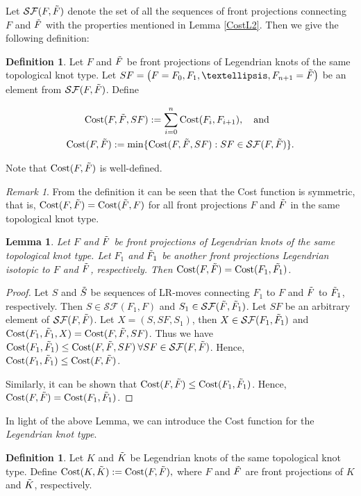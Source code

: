 \documentclass[11pt]{amsart}
\numberwithin{equation}{section}
\theoremstyle{plain}
\newtheorem{Lemma}[equation]{Lemma}
\theoremstyle{definition}
\newtheorem{definition}[equation]{Definition}
\theoremstyle{remark} \newtheorem{remark}[equation]{Remark}
\theoremstyle{remark} \newtheorem{observation}[equation]{Observation}
\newcommand{\Cost}{\text{Cost}}
\begin{document}
Let $\mathcal{SF}(F,\Tilde{F})$ denote the set of all the sequences of front projections connecting $F$ and $\Tilde{F}$ with the properties mentioned in Lemma \ref{CostL2}. Then we give the following definition: 
\begin{definition}
 Let $F$ and $\Tilde{F}$ be front projections of Legendrian knots of the same topological knot type. Let $SF=\left(F=F_0,F_1,\ldots,F_{n+1}=\Tilde{F}\right)$ be an element from $ \mathcal{SF}(F,\Tilde{F})$. Define

 \begin{align*}
     \Cost(F,\Tilde{F},SF)&:=\sum_{i=0}^{n}\Cost(F_{i},F_{i+1}), \quad \text{and}\\
     \Cost(F,\Tilde{F}):=\min\{&\Cost(F,\Tilde{F},SF):SF\in \mathcal{SF}(F,\Tilde{F})\}.
 \end{align*}
\end{definition}
Note that $\Cost(F,\Tilde{F})$ is well-defined.
\begin{remark}\label{re:Cost1}
    From the definition it can be seen that the Cost function is symmetric, that is, $\Cost(F,\Tilde{F})=\Cost(\Tilde{F},F)$ for all front projections $F$ and $\Tilde{F}$ in the same topological knot type.
\end{remark}

\begin{Lemma}\label{CostL3}
   Let $F$ and $\Tilde{F}$ be front projections of Legendrian knots of the same topological knot type. Let $F_1$ and $\Tilde{F}_1$ be another front projections Legendrian isotopic to $F$ and $\Tilde{F}$, respectively. Then $\Cost(F,\Tilde{F})=\Cost(F_1,\Tilde{F_1})$.
\end{Lemma}
\begin{proof}
    Let $S$ and $\Tilde{S}$ be sequences of LR-moves connecting $F_1$ to $F$ and $\Tilde{F}$ to $\Tilde{F}_1$, respectively. Then $S\in \mathcal{SF}(F_1, F)$ and $S_1\in\mathcal{SF}(\Tilde{F},\Tilde{F}_1)$. Let $SF$ be an arbitrary element of $ \mathcal{SF}(F,\Tilde{F})$. Let $X=\left(S,SF,S_1\right)$, then $X\in\mathcal{SF}(F_1,\Tilde{F}_1)$ and $\Cost(F_1,\Tilde{F}_1,X)=\Cost(F,\Tilde{F},SF)$. Thus we have $\Cost(F_1,\Tilde{F}_1)\leq \Cost(F,\Tilde{F},SF) \: \forall SF\in \mathcal{SF}(F,\Tilde{F})$. Hence, $\Cost(F_1,\Tilde{F}_1)\leq \Cost(F,\Tilde{F})$.

    Similarly, it can be shown that $\Cost(F,\Tilde{F})\leq \Cost(F_1,\Tilde{F}_1)$. Hence, $\Cost(F,\Tilde{F})=\Cost(F_1,\Tilde{F}_1)$.
\end{proof}
In light of the above Lemma, we can introduce the Cost function for the \emph{Legendrian knot type}. 
\begin{definition}
    Let $K$ and $\Tilde{K}$ be Legendrian knots of the same topological knot type. Define $\Cost(K,\Tilde{K}):= \Cost(F,\Tilde{F}),$ where $F$ and $\Tilde{F}$ are front projections of $K$ and $\Tilde{K}$, respectively.
\end{definition}
\end{document}
